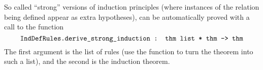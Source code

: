 So called ``strong'' versions of induction principles (where instances
of the relation being defined appear as extra hypotheses), can be
automatically proved with a call to the function
\[
\ml{IndDefRules.derive\_strong\_induction : thm list * thm -> thm}
\]
The first argument is the list of rules (use the 
function to turn the  theorem into such a list), and
the second is the induction theorem.



